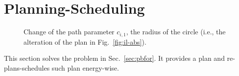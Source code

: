 \documentclass[letterpaper,10pt,conference,twoside]{IEEEtran}
\newcommand{\figpath}{./figures}
\theoremstyle{definition}
\begin{document}




\section{Planning-Scheduling}  %
\label{sec:algo}               %
\begin{figure}[t]
  \footnotesize
  \begin{minipage}[c]{0.23\columnwidth}
    \vspace*{-6.6ex}
    \caption{Change of the path parameter $c_{i,1}$, the radius of the circle (i.e., the alteration of the plan in Fig.~\ref{fig:il-abs}).}
    \label{fig:tee1}
  \end{minipage}\hfill
  \begin{minipage}[c]{0.05\columnwidth}
  \end{minipage}\hfill
  \begin{minipage}[c]{0.71\columnwidth}
    \centering
    
  \end{minipage}
  \vspace*{-4.2ex}
\end{figure}

This section solves the problem %
in Sec.~\ref{sec:pbfor}. It provides a plan %
and re-plans-schedules such plan energy-wise. %
\end{document}
